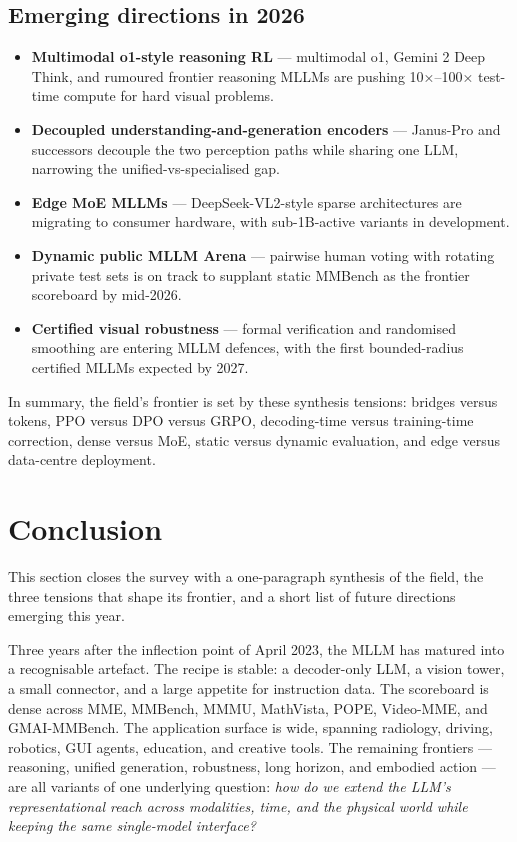 \subsection{Emerging directions in 2026}\label{emerging-directions-in-2026}

\begin{itemize}
\tightlist
\item
  \textbf{Multimodal o1-style reasoning RL} --- multimodal o1, Gemini 2 Deep Think, and rumoured frontier reasoning MLLMs are pushing 10×--100× test-time compute for hard visual problems.
\item
  \textbf{Decoupled understanding-and-generation encoders} --- Janus-Pro and successors decouple the two perception paths while sharing one LLM, narrowing the unified-vs-specialised gap.
\item
  \textbf{Edge MoE MLLMs} --- DeepSeek-VL2-style sparse architectures are migrating to consumer hardware, with sub-1B-active variants in development.
\item
  \textbf{Dynamic public MLLM Arena} --- pairwise human voting with rotating private test sets is on track to supplant static MMBench as the frontier scoreboard by mid-2026.
\item
  \textbf{Certified visual robustness} --- formal verification and randomised smoothing are entering MLLM defences, with the first bounded-radius certified MLLMs expected by 2027.
\end{itemize}

In summary, the field's frontier is set by these synthesis tensions: bridges versus tokens, PPO versus DPO versus GRPO, decoding-time versus training-time correction, dense versus MoE, static versus dynamic evaluation, and edge versus data-centre deployment.

\section{Conclusion}\label{conclusion}

This section closes the survey with a one-paragraph synthesis of the field, the three tensions that shape its frontier, and a short list of future directions emerging this year.

Three years after the inflection point of April 2023, the MLLM has matured into a recognisable artefact. The recipe is stable: a decoder-only LLM, a vision tower, a small connector, and a large appetite for instruction data. The scoreboard is dense across MME, MMBench, MMMU, MathVista, POPE, Video-MME, and GMAI-MMBench. The application surface is wide, spanning radiology, driving, robotics, GUI agents, education, and creative tools. The remaining frontiers --- reasoning, unified generation, robustness, long horizon, and embodied action --- are all variants of one underlying question: \emph{how do we extend the LLM's representational reach across modalities, time, and the physical world while keeping the same single-model interface?}

